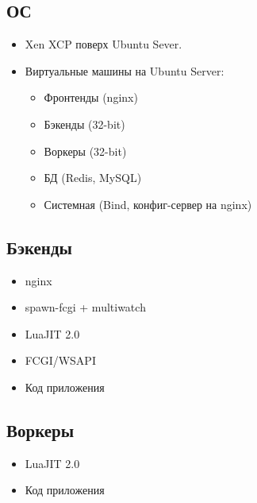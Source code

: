 \documentclass[aspectratio=169,handout,bigger]{beamer}
\begin{document}

\subsection*{ОС}

\begin{frame}
  \begin{itemize}
    \item Xen XCP поверх Ubuntu Sever.
    \item Виртуальные машины на Ubuntu Server:
    \begin{itemize}
      \item Фронтенды (nginx)
      \item Бэкенды (32-bit)
      \item Воркеры (32-bit)
      \item БД (Redis, MySQL)
      \item Системная (Bind, конфиг-сервер на nginx)
    \end{itemize}
  \end{itemize}
\end{frame}


\subsection*{Бэкенды}

\begin{frame}
  \begin{itemize}
    \item nginx
    \item spawn-fcgi + multiwatch
    \item LuaJIT 2.0
    \item FCGI/WSAPI
    \item Код приложения
  \end{itemize}
\end{frame}


\subsection*{Воркеры}

\begin{frame}
  \begin{itemize}
    \item LuaJIT 2.0
    \item Код приложения
  \end{itemize}
\end{frame}
\end{document}
